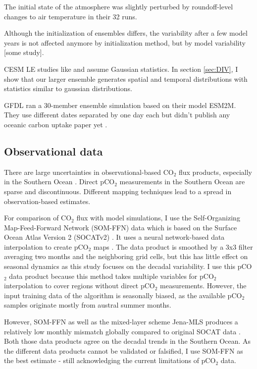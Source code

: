 \documentclass[12pt]{article}
\begin{document}
The initial state of the atmosphere was slightly perturbed by roundoff-level changes to air temperature in their 32 runs. 

Although the initialization of ensembles differs, the variability after a few model years is not affected anymore by initialization method, but by model variability [some study].

CESM LE studies like \cite{Deser2012} and \cite{Thompson2015} assume Gaussian statistics. In section \ref{sec:DIV}, I show that our larger ensemble generates spatial and temporal distributions with statistics similar to gaussian distributions.

GFDL ran a 30-member ensemble simulation based on their model ESM2M. They use different dates separated by one day each but didn't publish any oceanic carbon uptake paper yet \citep{Rodgers2015}.






\subsection{Observational data}
There are large uncertainties in observational-based CO$_2$ flux products, especially in the Southern Ocean \citep{Roedenbeck2015}. Direct pCO$_2$ measurements in the Southern Ocean are sparse and discontinuous. Different mapping techniques lead to a spread in observation-based estimates.

For comparison of CO$_2$ flux with model simulations, I use the Self-Organizing Map-Feed-Forward Network (SOM-FFN) data which is based on the Surface Ocean Atlas Version 2 (SOCATv2) \citep{Bakker2014}. It uses a neural network-based data interpolation to create pCO$_2$ maps \citep{Landschuetzer2014}. The data product is smoothed by a 3x3 filter averaging two months and the neighboring grid cells, but this has little effect on seasonal dynamics as this study focuses on the decadal variability. I use this pCO$_2$ data product because this method takes multiple variables for pCO$_2$ interpolation to cover regions without direct pCO$_2$ measurements. However, the input training data of the algorithm is seasonally biased, as the available pCO$_2$ samples originate mostly from austral summer months.

However, SOM-FFN as well as the mixed-layer scheme Jena-MLS \citep{Roedenbeck2013,Roedenbeck2014} produces a relatively low monthly mismatch globally compared to original SOCAT data \citep{Roedenbeck2015}. Both those data products agree on the decadal trends in the Southern Ocean. As the different data products cannot be validated or falsified, I use SOM-FFN as the best estimate - still acknowledging the current limitations of pCO$_2$ data.
\end{document}
